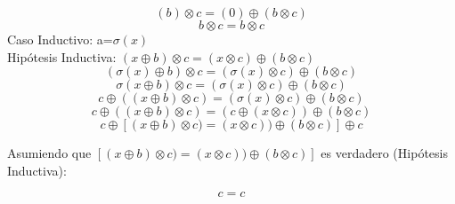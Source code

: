 \documentclass{article}
\begin{document}
\begin{itemize}
\[\]
\[
       (b)\otimes c = (0) \oplus (b \otimes c)
\]
\[
       b\otimes c = b \otimes c
\]
\large{Caso Inductivo:}
a=$\sigma(x)$\\
Hipótesis Inductiva:
$(x\oplus b)\otimes c = (x\otimes c) \oplus (b \otimes c)$
\[
    (\sigma(x)\oplus b)\otimes c = (\sigma(x)\otimes c) \oplus (b \otimes c)   
\]
\[
    \sigma(x\oplus b)\otimes c = (\sigma(x)\otimes c) \oplus (b \otimes c)   
\]
\[
    c\oplus ((x\oplus b)\otimes c) = (\sigma(x)\otimes c) \oplus (b \otimes c)   
\]
\[
    c\oplus ((x\oplus b)\otimes c) = (c\oplus(x\otimes c)) \oplus (b \otimes c)   
\]
\[
    c\oplus [(x\oplus b)\otimes c) = (x\otimes c)) \oplus (b \otimes c)] \oplus c
\]
\begin{center}Asumiendo que $[(x\oplus b)\otimes c) = (x\otimes c)) \oplus (b \otimes c)]$ es verdadero (Hipótesis Inductiva):\end{center}
\[
   c=c
\]

\end{itemize}
\end{document}

